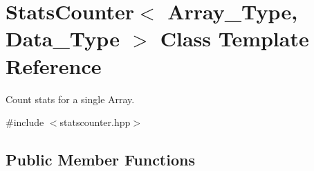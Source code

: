 \hypertarget{class_stats_counter}{}\section{Stats\+Counter$<$ Array\+\_\+\+Type, Data\+\_\+\+Type $>$ Class Template Reference}
\label{class_stats_counter}


Count stats for a single Array.  




{\ttfamily \#include $<$statscounter.\+hpp$>$}

\subsection*{Public Member Functions}
